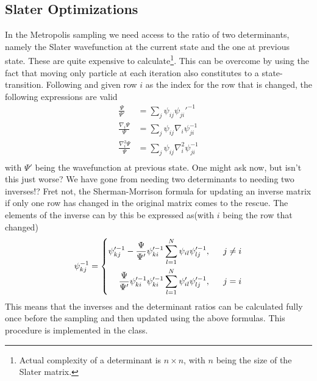 \subsection{Slater Optimizations}
    In the Metropolis sampling we need access to the ratio of two determinants,
    namely the Slater wavefunction at the current state and the one at previous
    state. These are quite expensive to calculate\footnote{Actual complexity of
    a determinant is $n\times n$, with $n$ being the size of the Slater
    matrix.}. This can be overcome by using the fact that moving only
     particle at each iteration also constitutes to a
    state-transition. Following \cite{vmc} and given row $i$ as the index for
    the row that is changed, the following expressions are valid
        \begin{equation}
            \begin{aligned}
                \frac{\Psi}{\Psi'} &= \sum_j \psi_{ij} \psi_{ji}'^{-1} \\
                \frac{\nabla_i \Psi}{\Psi} &= \sum_j \psi_{ij} \nabla_i
                \psi_{ji}^{-1} \\
                \frac{\nabla^2_i \Psi}{\Psi} &= \sum_j \psi_{ij} \nabla^2_i
                \psi_{ji}^{-1} \\
            \end{aligned}
        \end{equation}
    with $\Psi'$ being the wavefunction at previous state. One might ask now,
    but isn't this just worse? We have gone from needing two determinants to
    needing two inverses!? Fret not, the Sherman-Morrison\cite{shermorInv}
    formula for updating an inverse matrix if only one row has changed in the
    original matrix comes to the rescue. The elements of the inverse can by
    this be expressed as(with $i$ being the row that changed)
        \begin{equation}
            \psi^{-1}_{kj} = \left\{\begin{aligned}
                \psi'^{-1}_{kj} - \frac{\Psi}{\Psi'}\psi'^{-1}_{ki}
                \suml{l=1}{N}\psi_{il}\psi'^{-1}_{lj}, \indent j \neq i\\
                \frac{\Psi}{\Psi'}\psi'^{-1}_{ki}\psi'^{-1}_{ki}
                \suml{l=1}{N}\psi'_{il}\psi'^{-1}_{lj}, \indent j = i
            \end{aligned}\right.
        \end{equation}
    This means that the inverses and the determinant ratios can be calculated
    fully once before the sampling and then updated using the above formulas.
    This procedure is implemented in the  class.

